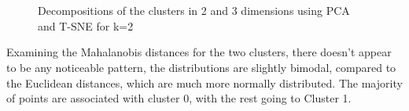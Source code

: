 \begin{figure}[H]
	\centering
	\\
	\\
	\caption{Decompositions of the clusters in 2 and 3 dimensions using PCA and T-SNE for k=2}
	\label{fig:k2pca}
\end{figure}
Examining the Mahalanobis distances for the two clusters, there doesn't appear to be any noticeable pattern, the distributions are slightly bimodal, compared to the Euclidean distances, which are much more normally distributed. The majority of points are associated with cluster 0, with the rest going to Cluster 1.
